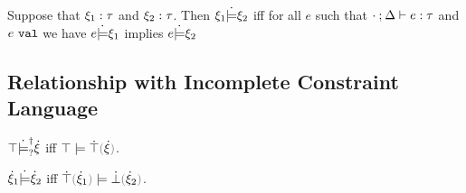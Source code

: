 \begin{definition}
  \label{defn:complete-constraint-entailment}
  Suppose that $\xi_1 : \tau$ and $\xi_2 : \tau$.
  Then $\xi_1 \dot{\models} \xi_2$ iff for all $e$ such that $\cdot \mathbin{;} \Delta \vdash e : \tau$ and $e ~\mathtt{val}$ we have $e \dot{\models} \xi_1$ implies $e \dot{\models} \xi_2$
\end{definition}

\subsection{Relationship with Incomplete Constraint Language}

\begin{theorem}
\label{thrm:demystify-exhaustiveness}
$\top \dot{\models}_{?}^{\dag} \dot{\xi}$ iff $\ccsatisfy{\ctruth}{\ctruify{\hxi}}$.
\end{theorem}

\begin{theorem}
\label{thrm:demystify-redundancy}
$\dot{\xi}_1 \dot{\models} \dot{\xi}_2$ iff $\ccsatisfy{\ctruify{\hxi_1}}{\cfalsify{\hxi_2}}$.
\end{theorem}



